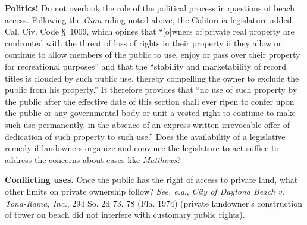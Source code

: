 \item \textbf{Politics!} Do not overlook the role of the political process in
questions of beach access. Following the \textit{Gion} ruling noted above, the
California legislature added Cal. Civ. Code \S~1009, which opines that
``[o]wners of private real property are confronted with the threat of loss of
rights in their property if they allow or continue to allow members of the
public to use, enjoy or pass over their property for recreational purposes'' and
that the ``stability and marketability of record titles is clouded by such
public use, thereby compelling the owner to exclude the public from his
property.'' It therefore provides that ``no use of such property by the public
after the effective date of this section shall ever ripen to confer upon the
public or any governmental body or unit a vested right to continue to make such
use permanently, in the absence of an express written irrevocable offer of
dedication of such property to such use.'' Does the availability of a
legislative remedy if landowners organize and convince the legislature to act
suffice to address the concerns about cases like \textit{Matthews}? 


\item \textbf{Conflicting uses.} Once the public has the right of access to
private land, what other limits on private ownership follow? \textit{See, e.g.},
\emph{City of Daytona Beach v. Tona-Rama, Inc.}, 294 So. 2d 73, 78 (Fla. 1974)
(private landowner's construction of tower on beach did not interfere with
customary public rights).


